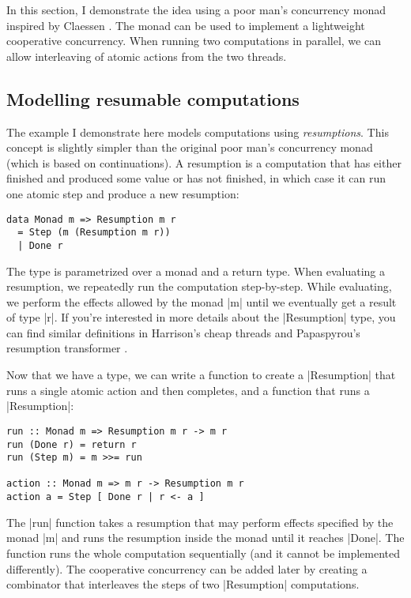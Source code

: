 \documentclass{tmr}
\begin{document}
In this section, I demonstrate the idea using a poor man's concurrency monad inspired by Claessen \cite{poorman}. The monad can be used to implement a lightweight cooperative concurrency. When 
running two computations in parallel, we can allow interleaving of atomic actions from the two 
threads.


\subsection{Modelling resumable computations}

The example I demonstrate here models computations using \textit{resumptions}. This concept is 
slightly simpler than the original poor man's concurrency monad (which is based on continuations). 
A resumption is a computation that has either finished and produced some value or has not
finished, in which case it can run one atomic step and produce a new resumption:

\begin{verbatim}
data Monad m => Resumption m r 
  = Step (m (Resumption m r))
  | Done r
\end{verbatim}
The type is parametrized over a monad and a return type. When evaluating a resumption, we 
repeatedly run the computation step-by-step. While evaluating, we perform the effects allowed by
the monad |m| until we eventually get a result of type |r|. If you're interested in more details 
about the |Resumption| type, you can find similar definitions in Harrison's cheap threads 
\cite{cheapthreads} and Papaspyrou's resumption transformer \cite{resmonad}.

Now that we have a type, we can write a function to create a |Resumption| that runs a single
atomic action and then completes, and a function that runs a |Resumption|:

\begin{verbatim}
run :: Monad m => Resumption m r -> m r
run (Done r) = return r
run (Step m) = m >>= run

action :: Monad m => m r -> Resumption m r
action a = Step [ Done r | r <- a ]
\end{verbatim}
The |run| function takes a resumption that may perform effects specified by the monad |m| and
runs the resumption inside the monad until it reaches |Done|. The function runs the whole 
computation sequentially (and it cannot be implemented differently). The cooperative concurrency
can be added later by creating a combinator that interleaves the steps of two |Resumption|
computations.
\end{document}
